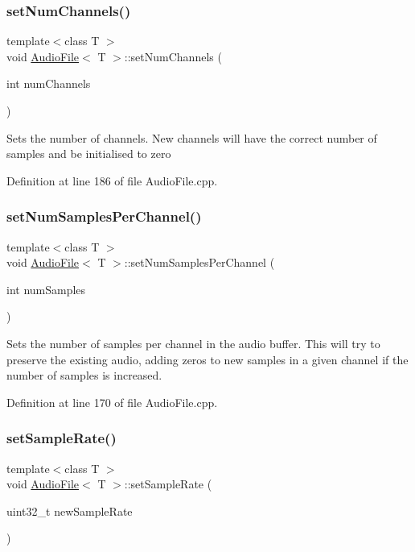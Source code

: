 \subsubsection{\texorpdfstring{set\+Num\+Channels()}{setNumChannels()}}
{\footnotesize\ttfamily template$<$class T $>$ \\
void \hyperlink{classAudioFile}{Audio\+File}$<$ T $>$\+::set\+Num\+Channels (\begin{DoxyParamCaption}\item[{int}]{num\+Channels }\end{DoxyParamCaption})}

Sets the number of channels. New channels will have the correct number of samples and be initialised to zero 

Definition at line 186 of file Audio\+File.\+cpp.

\mbox{\label{classAudioFile_a4cff9513d49e21d25de13513564784b7}} 
\subsubsection{\texorpdfstring{set\+Num\+Samples\+Per\+Channel()}{setNumSamplesPerChannel()}}
{\footnotesize\ttfamily template$<$class T $>$ \\
void \hyperlink{classAudioFile}{Audio\+File}$<$ T $>$\+::set\+Num\+Samples\+Per\+Channel (\begin{DoxyParamCaption}\item[{int}]{num\+Samples }\end{DoxyParamCaption})}

Sets the number of samples per channel in the audio buffer. This will try to preserve the existing audio, adding zeros to new samples in a given channel if the number of samples is increased. 

Definition at line 170 of file Audio\+File.\+cpp.

\mbox{\label{classAudioFile_a2d8fa306e40535113c3eba111e16483b}} 
\subsubsection{\texorpdfstring{set\+Sample\+Rate()}{setSampleRate()}}
{\footnotesize\ttfamily template$<$class T $>$ \\
void \hyperlink{classAudioFile}{Audio\+File}$<$ T $>$\+::set\+Sample\+Rate (\begin{DoxyParamCaption}\item[{uint32\+\_\+t}]{new\+Sample\+Rate }\end{DoxyParamCaption})}

